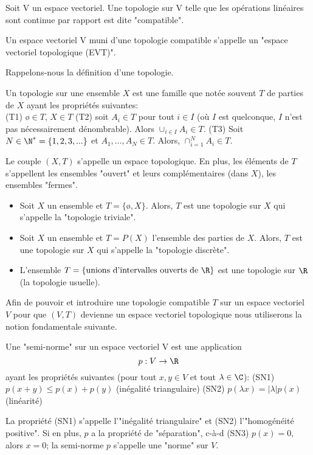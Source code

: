 \begin{definition}
	Soit V un espace vectoriel. Une topologie sur V telle que les opérations linéaires sont continue par rapport est dite "compatible".

	Un espace vectoriel V muni d'une topologie compatible s'appelle un "espace vectoriel topologique (EVT)".
\end{definition}

Rappelons-nous la définition d'une topologie.

\begin{definition}
	Un topologie sur une ensemble $X$ est une famille que notée souvent $T$ de parties de $X$ ayant les propriétés suivantes:\\
	(T1) $ø\in T$, $X\in T$
	(T2) soit $A_i\in T$ pour tout $i \in I$ (où $I$ est quelconque, $I$ n'est pas nécessairement dénombrable). Alors $\cup_{i\in I}A_i\in T$.
	(T3) Soit $N\in \N^*=\{1, 2, 3,...\}$ et $A_1,..., A_N\in T$. Alors, $\cap_{i=1}^NA_i\in T$.

	Le couple $(X, T)$ s'appelle un espace topologique. En plus, les éléments de $T$ s'appellent les ensembles "ouvert" et leurs complémentaires (dans $X$), les ensembles "fermes". 
\end{definition}

\begin{example}
	\begin{itemize}[(a)]
		\item Soit $X$ un ensemble et $T=\{ø,X\}$. Alors, $T$ est une topologie sur $X$ qui s'appelle la "topologie triviale".
		\item Soit $X$ un ensemble et $T=P(X)$ l'ensemble des parties de $X$. Alors, $T$ est une topologie sur $X$ qui s'appelle la "topologie discrète".
		\item L'ensemble $T=\{ \text{unions d'intervalles ouverts de } \R \}$ est une topologie sur $\R$ (la topologie usuelle).
	\end{itemize}
\end{example}

Afin de pouvoir et introduire une topologie compatible $T$ sur un espace vectoriel $V$ pour que $(V, T)$ devienne un espace vectoriel topologique nous utiliserons la notion fondamentale suivante.

\begin{definition} %
	Une "semi-norme" sur un espace vectoriel V est une application
		\[p:V\rightarrow  \R\]
	ayant les propriétés suivantes (pour tout $x,y\in V$ et tout $\lambda\in\C$):
	(SN1) $p(x+y)≤p(x)+p(y)$ (inégalité triangulaire)
	(SN2) $p(\lambda x)=|\lambda|p(x)$ (linéarité)
	
	La propriété (SN1) s'appelle l'"inégalité triangulaire" et (SN2) l'"homogénéité positive".
	Si en plus, $p$ a la propriété de "séparation", c-à-d 
	(SN3) $p(x)=0$, alors $x=0$; 
	la semi-norme $p$ s'appelle une "norme" sur $V$.
\end{definition}


